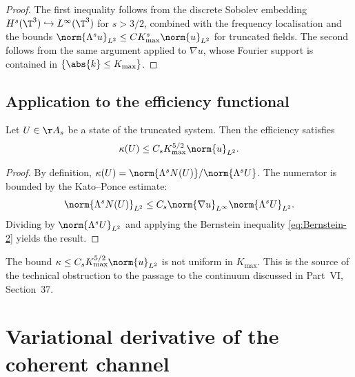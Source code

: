 \begin{proof}
The first inequality follows from the discrete Sobolev embedding 
$H^s(\T^3)\hookrightarrow L^\infty(\T^3)$ for $s>3/2$, combined 
with the frequency localisation and the bounds 
$\norm{\Lambda^s u}_{L^2}\leq C K_{\max}^s\norm{u}_{L^2}$ for 
truncated fields. The second follows from the same argument applied 
to $\nabla u$, whose Fourier support is contained in 
$\{\abs{k}\leq K_{\max}\}$.
\end{proof}

\subsection{Application to the efficiency functional}
\label{ssec:efficiency-bound}

\begin{proposition}\label{prop:kappa-bound-app}
Let $U\in\AA_s$ be a state of the truncated system. Then the 
efficiency satisfies
\begin{equation}\label{eq:kappa-bound-app}
\kappa(U)\leq C_s K_{\max}^{5/2}\norm{u}_{L^2}.
\end{equation}
\end{proposition}

\begin{proof}
By definition, $\kappa(U) = \norm{\Lambda^s N(U)}/\norm{\Lambda^s U}$. 
The numerator is bounded by the Kato--Ponce estimate:
\begin{equation*}
\norm{\Lambda^s N(U)}_{L^2}\leq C_s\norm{\nabla u}_{L^\infty}
\norm{\Lambda^s U}_{L^2}.
\end{equation*}
Dividing by $\norm{\Lambda^s U}_{L^2}$ and applying the Bernstein 
inequality \eqref{eq:Bernstein-2} yields the result.
\end{proof}

\begin{remark}\label{rem:kappa-growth}
The bound $\kappa\leq C_s K_{\max}^{5/2}\norm{u}_{L^2}$ is not 
uniform in $K_{\max}$. This is the source of the technical 
obstruction to the passage to the continuum discussed in Part~VI, 
Section~37.
\end{remark}

\section{Variational derivative of the coherent channel}
\label{app:B}


